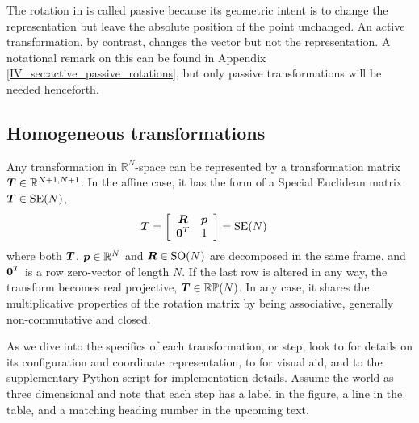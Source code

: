 The rotation in  is called passive because its geometric intent is to change the representation but leave the absolute position of the point unchanged. An active transformation, by contrast, changes the vector but not the representation. A notational remark on this can be found in Appendix \ref{IV_sec:active_passive_rotations}, but only passive transformations will be needed henceforth.


\subsection{Homogeneous transformations}

Any transformation in $\mathbb{R}^N$-space can be represented by a transformation matrix $\boldsymbol{T} \in \mathbb{R}^{N+1,N+1}$. In the affine case, it has the form of a Special Euclidean matrix $\boldsymbol{T}\in\mathrm{SE}(N)$,
%
\begin{align}
\dvec{T} &= 
\left[\begin{array}{c c}
 \mat{R}  & \dvec{p} \\%
 \dvec{0}^T  &  1
\end{array}\right] = \mathrm{SE}(N)\label{IV_eq_T_decomposed}
\end{align}
%
where both $\boldsymbol{T}$, $\boldsymbol{p}\in\mathbb{R}^N$ and $\boldsymbol{R}\in\mathrm{SO}(N)$ are decomposed in the same frame, and $\boldsymbol{0}^T$ is a row zero-vector of length $N$. If the last row is altered in any way, the transform becomes real projective, $\boldsymbol{T}\in\mathbb{RP}(N)$. In any case, it shares the multiplicative properties of the rotation matrix by being associative, generally non-commutative and closed. %


As we dive into the specifics of each transformation, or step, look to  for details on its configuration and coordinate representation, to  for visual aid, and to the supplementary Python script for implementation details. Assume the world as three dimensional and note that each step has a label in the figure, a line in the table, and a matching heading number in the upcoming text.



